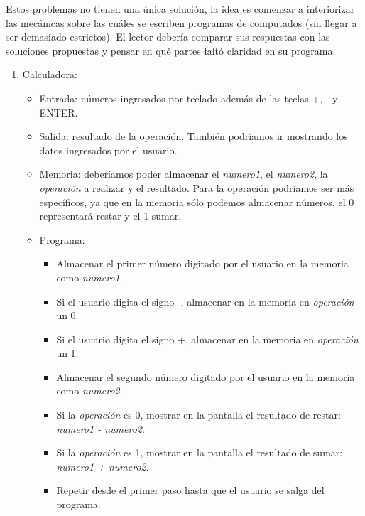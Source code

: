 \begin{Answer}	
	
Estos problemas no tienen una única solución, la idea es comenzar a interiorizar las mecánicas sobre las cuáles se escriben programas de computados (sin llegar a ser demasiado estrictos). El lector debería comparar sus respuestas con las soluciones propuestas y pensar en qué partes faltó claridad en su programa.
		
\begin{enumerate}
\item Calculadora:
	\begin{itemize}
		\item Entrada: números ingresados por teclado además de las teclas +, - y ENTER.
		\item Salida: resultado de la operación. También podríamos ir mostrando los datos ingresados por el usuario.
		\item Memoria: deberíamos poder almacenar el \emph{numero1}, el \emph{numero2}, la \emph{operación} a realizar y el resultado. Para la operación podríamos ser más específicos, ya que en la memoria sólo podemos almacenar números, el 0 representará restar y el 1 sumar.
		\item Programa:
		\begin{itemize}
			\item Almacenar el primer número digitado por el usuario en la memoria como  \emph{numero1}.					
			\item Si el usuario digita el signo -, almacenar en la memoria en \emph{operación} un 0.
			\item Si el usuario digita el signo +, almacenar en la memoria en \emph{operación} un 1.
			\item Almacenar el segundo número digitado por el usuario en la memoria como  \emph{numero2}.
			\item Si la \emph{operación} es 0, mostrar en la pantalla el resultado de restar: \emph{numero1 - numero2}.					
			\item Si la \emph{operación} es 1, mostrar en la pantalla el resultado de sumar: \emph{numero1 + numero2}.
			\item Repetir desde el primer paso hasta que el usuario se salga del programa.
		\end{itemize}
		
	\end{itemize}
	

\end{enumerate}
\end{Answer}
